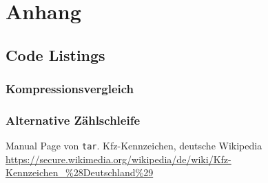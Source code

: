 \documentclass[12pt]{report}
\newcommand\gqq[1]{\glqq #1\grqq}
\begin{document}
\part{Anhang}
\begin{appendix}


\chapter{Code Listings}
\section{Kompressionsvergleich}
\label{listing:compression}
\lstset{language=bash}


\section{Alternative Zählschleife}
\label{listing:zahlen2}

\lstset{language=bash}

 


\end{appendix}

\begin{thebibliography}{n}
 Manual Page von \texttt{tar}.
 \gqq{Kfz-Kennzeichen}, deutsche Wikipedia \url{https://secure.wikimedia.org/wikipedia/de/wiki/Kfz-Kennzeichen_\%28Deutschland\%29}
\end{thebibliography}
\end{document}
